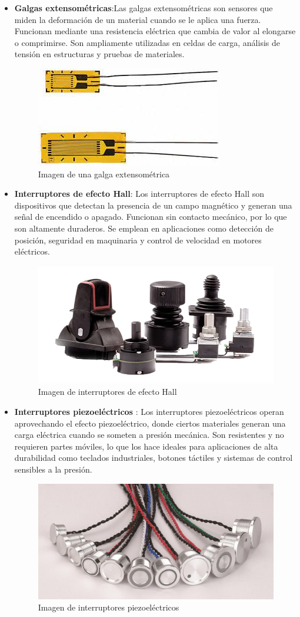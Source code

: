 \begin{itemize}
	\item \textbf{Galgas extensométricas}:Las galgas extensométricas son sensores que miden la deformación de un material cuando se le aplica una fuerza. Funcionan mediante una resistencia eléctrica que cambia de valor al elongarse o comprimirse. Son ampliamente utilizadas en celdas de carga, análisis de tensión en estructuras y pruebas de materiales.
	\begin{figure}[h]
		\centering
		\includegraphics[width=5 cm]{img/Galga}
		\caption{Imagen de una galga extensométrica}
		\label{fig:Galga}
	\end{figure}
	\item \textbf{Interruptores de efecto Hall}: Los interruptores de efecto Hall son dispositivos que detectan la presencia de un campo magnético y generan una señal de encendido o apagado. Funcionan sin contacto mecánico, por lo que son altamente duraderos. Se emplean en aplicaciones como detección de posición, seguridad en maquinaria y control de velocidad en motores eléctricos.
	\begin{figure}[h]
		\centering
		\includegraphics[width=10 cm]{img/Ihall}
		\caption{Imagen de interruptores de efecto Hall}
		\label{fig:ihall}
	\end{figure}
	\item \textbf{Interruptores piezoeléctricos }: Los interruptores piezoeléctricos operan aprovechando el efecto piezoeléctrico, donde ciertos materiales generan una carga eléctrica cuando se someten a presión mecánica. Son resistentes y no requieren partes móviles, lo que los hace ideales para aplicaciones de alta durabilidad como teclados industriales, botones táctiles y sistemas de control sensibles a la presión.
	\begin{figure}[h]
		\centering
		\includegraphics[width=8 cm]{img/ipiez}
		\caption{Imagen de interruptores piezoeléctricos}
		\label{fig:ipiez}
	\end{figure}\newpage
\end{itemize}